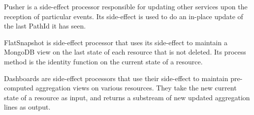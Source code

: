 Pusher is a side-effect processor responsible for updating other services upon the reception of particular events. Its side-effect is used to do an in-place update of the last PathId
it has seen.

FlatSnapshot is side-effect processor that uses its side-effect to maintain a MongoDB view on the last state of each resource that is not deleted. Its process method is the identity function on the current state of a resource. 

Dashboards are side-effect processors that use their side-effect to maintain pre-computed aggregation views on various resources. They take the new current state of a resource as input,
and returns a substream of new updated aggregation lines as output.



